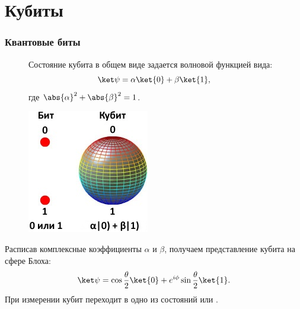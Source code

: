 \documentclass[12pt,pdf]{beamer}
\renewcommand{\~}[1]{\widetilde{#1}}
\begin{document}
  \section{Кубиты}
  \begin{frame}
    \frametitle{Квантовые биты}
    \begin{figure}[h!]
      \center
      \begin{minipage}{.65\textwidth}
        Состояние кубита в общем виде задается волновой функцией вида:
        \[
          \ket\psi = \alpha\ket{0} + \beta\ket{1},
        \]
        где \( \abs{\alpha}^2 + \abs{\beta}^2 = 1 \).
      \end{minipage}
      \begin{minipage}{.3\textwidth}
        \includegraphics[width=\textwidth]{qubit}
      \end{minipage}
    \end{figure}
    \vspace{.5ex}
    Расписав комплексные коэффициенты \( \alpha \) и \( \beta \), получаем
    представление кубита на сфере Блоха:
    \[
      \ket\psi = \cos\frac{\theta}{2}\ket{0} +
        e^{i\phi}\sin\frac{\theta}{2}\ket{1}.
    \]
    При измерении кубит переходит в одно из состояний  или .
  \end{frame}
\end{document}
